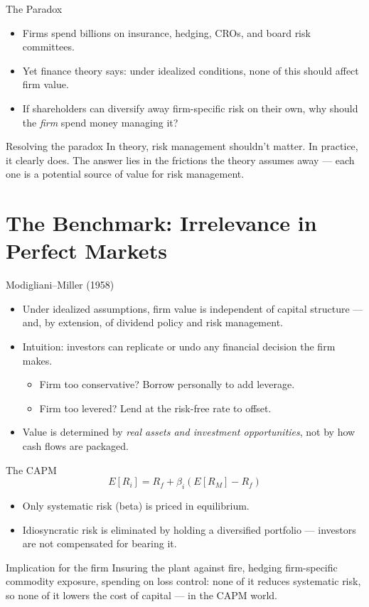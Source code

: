 \documentclass[11pt, aspectratio=169]{beamer}
\begin{document}
\begin{frame}{The Paradox}
\begin{itemize}
  \item Firms spend billions on insurance, hedging, CROs, and board risk committees.
  \item Yet finance theory says: under idealized conditions, none of this should affect firm value.
  \item If shareholders can diversify away firm-specific risk on their own, why should the \emph{firm} spend money managing it?
\end{itemize}
\medskip
\begin{block}{Resolving the paradox}
In theory, risk management shouldn't matter. In practice, it clearly does.
The answer lies in the \alert{frictions} the theory assumes away --- each one is a
potential source of value for risk management.
\end{block}
\end{frame}

\section{The Benchmark: Irrelevance in Perfect Markets}

\begin{frame}{Modigliani--Miller (1958)}
\begin{itemize}
  \item Under idealized assumptions, firm value is independent of capital structure --- and, by extension, of dividend policy and risk management.
  \item Intuition: investors can \alert{replicate or undo} any financial decision the firm makes.
  \begin{itemize}
    \item Firm too conservative? Borrow personally to add leverage.
    \item Firm too levered? Lend at the risk-free rate to offset.
  \end{itemize}
  \item Value is determined by \emph{real assets and investment opportunities}, not by how cash flows are packaged.
\end{itemize}
\end{frame}

\begin{frame}{The CAPM}
\[
E[R_i] = R_f + \beta_i \left( E[R_M] - R_f \right)
\]
\begin{itemize}
  \item Only \alert{systematic risk} (beta) is priced in equilibrium.
  \item \alert{Idiosyncratic risk} is eliminated by holding a diversified portfolio --- investors are not compensated for bearing it.
\end{itemize}
\medskip
\begin{block}{Implication for the firm}
Insuring the plant against fire, hedging firm-specific commodity exposure, spending on loss control: none of it reduces systematic risk, so none of it lowers the cost of capital --- in the CAPM world.
\end{block}
\end{frame}
\end{document}
